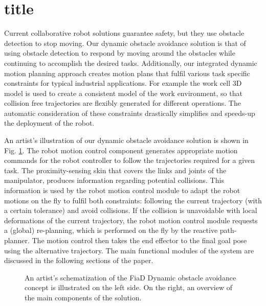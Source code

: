 \section{title}
Current collaborative robot solutions guarantee safety, but they use
obstacle detection to stop moving. Our dynamic obstacle avoidance
solution is that of using obstacle detection to respond by moving around the
obstacles while continuing to accomplish the desired tasks. Additionally, our integrated dynamic motion planning approach creates motion
plans that fulfil various task specific constraints for typical industrial
applications. For example the work cell 3D model is used to create a consistent
model of the work environment, so that collision free trajectories are flexibly 
generated for different operations. The automatic consideration of these
constraints  drastically simplifies and speeds-up the deployment of the robot.

An artist's illustration of our dynamic obstacle avoidance solution is shown
in Fig. \ref{fig:overview}. The robot motion control component generates
appropriate motion commands for the robot controller to follow the trajectories required for a given task. The proximity-sensing skin that covers the links and joints of the manipulator, produces information regarding potential collisions. This information is used by the robot motion control
module to adapt the robot motions on the fly to fulfil both constraints:
following the current trajectory (with a certain tolerance) and avoid
collisions. If the collision is unavoidable with local deformations of the
current trajectory, the robot motion control module requests a (global) re-planning,
which is performed on the fly by the reactive path-planner. The motion control
then takes the end effector to the final goal pose using the alternative
trajectory. The main functional modules of the system are discussed in the following
sections of the paper.

\begin{figure}[t]
\centering
{}
\caption[]{An artist's schematization of the FiaD Dynamic obstacle avoidance
concept is illustrated on the left side. On the right, an overview of the main
components of the solution.}
\label{fig:overview}

\end{figure}

